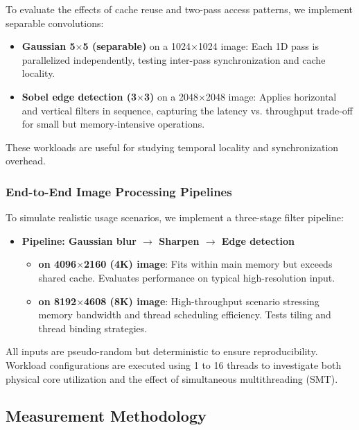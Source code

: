 \documentclass[conference, 10pt]{IEEEtran}
\begin{document}
To evaluate the effects of cache reuse and two-pass access patterns, we implement separable convolutions:

\begin{itemize}
    \item \textbf{Gaussian 5$\times$5 (separable)} on a 1024$\times$1024 image: Each 1D pass is parallelized independently, testing inter-pass synchronization and cache locality.
    \item \textbf{Sobel edge detection (3$\times$3)} on a 2048$\times$2048 image: Applies horizontal and vertical filters in sequence, capturing the latency vs. throughput trade-off for small but memory-intensive operations.
\end{itemize}

These workloads are useful for studying temporal locality and synchronization overhead.

\subsubsection{End-to-End Image Processing Pipelines}

To simulate realistic usage scenarios, we implement a three-stage filter pipeline:

\begin{itemize}
    \item \textbf{Pipeline: Gaussian blur $\rightarrow$ Sharpen $\rightarrow$ Edge detection}
    \begin{itemize}
        \item \textbf{on 4096$\times$2160 (4K) image}: Fits within main memory but exceeds shared cache. Evaluates performance on typical high-resolution input.
        \item \textbf{on 8192$\times$4608 (8K) image}: High-throughput scenario stressing memory bandwidth and thread scheduling efficiency. Tests tiling and thread binding strategies.
    \end{itemize}
\end{itemize}

All inputs are pseudo-random but deterministic to ensure reproducibility. Workload configurations are executed using 1 to 16 threads to investigate both physical core utilization and the effect of simultaneous multithreading (SMT).


\subsection{Measurement Methodology}
\end{document}
